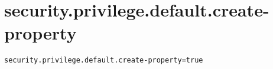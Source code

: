 \section{security.privilege.default.create-property}
\label{configuration:SecurityPrivilegeDefaultCreateProperty}
\AvailableInJavaOnly{\TODO}
\begin{lstlisting}[style=Props,caption={Usage example for \textit{security.privilege.default.create-property}}]
security.privilege.default.create-property=true
\end{lstlisting}